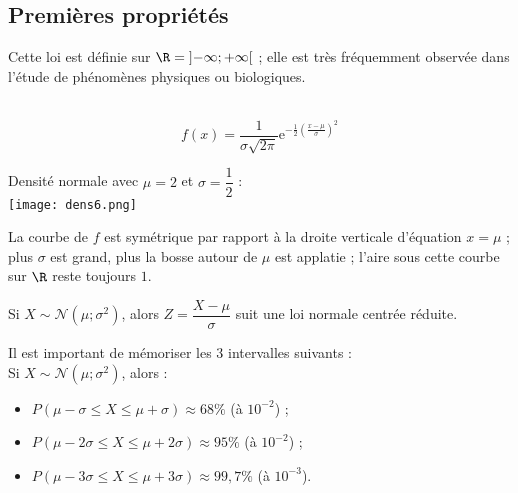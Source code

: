 \documentclass[a4paper,11pt]{article} \usepackage{FBarticle} \mapage{831}{Probabilités 2} %
\begin{document}
\begin{multicols}{2}
\subsection{Premières propriétés}

Cette loi est définie sur $\R=\left]-\infty;+\infty\right[$ ; elle est très fréquemment observée dans l'étude de phénomènes physiques ou biologiques.\par
{}\\
$$f(x)=\dfrac{1}{\sigma\sqrt{2\pi}}\textrm{e}^{-\frac{1}{2}\left(\frac{x-\mu}{\sigma}\right)^2}$$

\exem Densité normale avec $\mu=2$ et $\sigma=\dfrac{1}{2}$ :\\
\texttt{[image: dens6.png]}\par

\prop La courbe de $f$ est symétrique par rapport à la droite verticale d'équation $x=\mu$ ; plus $\sigma$ est grand, plus la bosse autour de $\mu$ est applatie ; l'aire sous cette courbe sur $\R$ reste toujours $1$.\par


\prop Si $X\sim\mathcal{N}(\mu;\sigma^2)$, alors $Z=\dfrac{X-\mu}{\sigma}$ suit une loi normale centrée réduite.\par


\prop Il est important de mémoriser les 3 intervalles suivants :\\ 
Si $X\sim\mathcal{N}(\mu;\sigma^2)$, alors :  %
\begin{itemize} 
\item $P(\mu-\sigma\leq X\leq \mu+\sigma)\approx68\%$ (à $10^{-2}$) ;
\item $P(\mu-2\sigma\leq X\leq\mu+2\sigma)\approx95\%$ (à $10^{-2}$) ;
\item $P(\mu-3\sigma\leq X\leq \mu+3\sigma)\approx99,7\%$ (à $10^{-3}$).\\
\end{itemize}
\par


\end{multicols}
\end{document}
